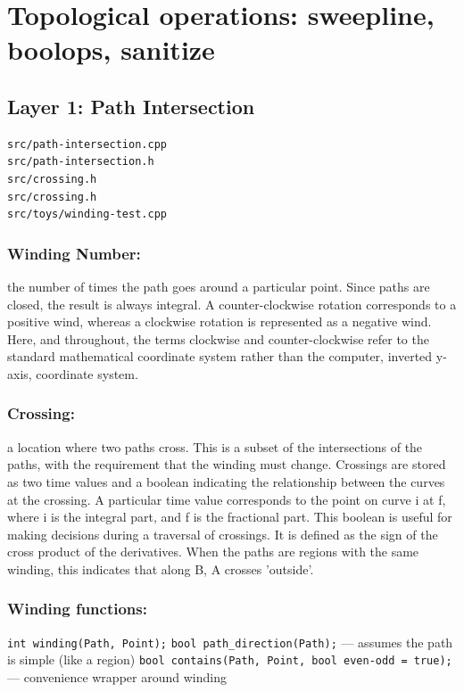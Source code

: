 \documentclass[openany]{book}
\begin{document}
\chapter{Topological operations: sweepline, boolops, sanitize}
\section{Layer 1: Path Intersection}

\begin{verbatim}
src/path-intersection.cpp
src/path-intersection.h
src/crossing.h
src/crossing.h
src/toys/winding-test.cpp
\end{verbatim}

\subsection{Winding Number:}
 the number of times the path goes around a particular point. Since paths are closed, the result is always integral. A counter-clockwise rotation corresponds to a positive wind, whereas a clockwise rotation is represented as a negative wind. Here, and throughout, the terms clockwise and counter-clockwise refer to the standard mathematical coordinate system rather than the computer, inverted y-axis, coordinate system.

\subsection{Crossing:}
 a location where two paths cross. This is a subset of the intersections of the paths, with the requirement that the winding must change. Crossings are stored as two time values and a boolean indicating the relationship between the curves at the crossing. A particular time value corresponds to the point on curve i at f, where i is the integral part, and f is the fractional part. This boolean is useful for making decisions during a traversal of crossings. It is defined as the sign of the cross product of the derivatives. When the paths are regions with the same winding, this indicates that along B, A crosses 'outside'.

\subsection{Winding functions:}

\verb|int winding(Path, Point);|
\verb|bool path_direction(Path);|  —  assumes the path is simple (like a region)
\verb|bool contains(Path, Point, bool even-odd = true);|  —  convenience wrapper around winding
\end{document}
